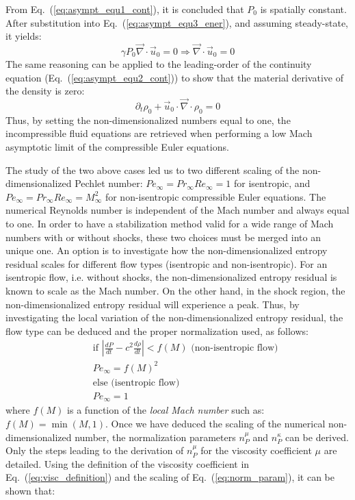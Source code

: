 \documentclass[preprint,10pt]{elsarticle}
\renewcommand{\div}{\vec{\nabla}\! \cdot \!}
\newcommand{\eqt}[1]{Eq.~(\ref{#1})}                     %
\begin{document}
\begin{itemize}
\begin{equation}
 \end{equation}
 From \eqt{eq:asympt_equ1_cont}, it is concluded that $P_0$ is spatially constant. After substitution into \eqt{eq:asympt_equ3_ener}, and assuming steady-state, it yields:
 \begin{equation}
\gamma P_0 \div  \vec{u}_0 = 0 \Rightarrow \div  \vec{u}_0 = 0
 \end{equation}
The same reasoning can be applied to the leading-order of the continuity equation (\eqt{eq:asympt_equ2_cont}) to show that the material derivative of the density is zero:
\begin{equation}
\partial_t \rho_0 + \vec{u}_0 \cdot \div \rho_0 = 0
\end{equation}
Thus, by setting the non-dimensionalized numbers equal to one, the incompressible fluid equations are retrieved when performing a low Mach asymptotic limit of the compressible Euler equations.
\end{itemize}
The study of the two above cases led us to two different scaling of the non-dimensionalized Pechlet number: $Pe_\infty = Pr_\infty Re_\infty = 1$ for isentropic, and$Pe_\infty  = Pr_\infty Re_\infty = M_\infty^2$ for non-isentropic compressible Euler equations. The numerical Reynolds number is independent of the Mach number and always equal to one. In order to have a stabilization method valid for a wide range of Mach numbers with or without shocks, these two choices must be merged into an unique one. An option is to investigate how the non-dimensionalized entropy residual scales for different flow types (isentropic and non-isentropic). For an isentropic flow, i.e. without shocks, the non-dimensionalized entropy residual is known to scale as the Mach number. On the other hand, in the shock region, the non-dimensionalized entropy residual will experience a peak. Thus, by investigating the local variation of the non-dimensionalized entropy residual, the flow type can be deduced and the proper normalization used, as follows:
\begin{eqnarray}  \label{eq:norm_ent}
&&\text{if } \left| \frac{dP}{dt} - c^2 \frac{d \rho}{dt} \right| < f(M) \text{ (non-isentropic flow)}\nonumber \\
&&Pe_\infty = f(M)^2 \nonumber \\
&&\text{else (isentropic flow)}\\
&&Pe_\infty = 1 \nonumber
\end{eqnarray}
where $f(M)$ is a function of the \emph{local Mach number} such as: $f(M) = \min (M, 1)$. Once we have deduced the scaling of the numerical non-dimensionalized number, the normalization parameters $n_P^{\mu}$ and $n_P^{\kappa}$ can be derived. Only the steps leading to the derivation of $n_P^{\mu}$ for the viscosity coefficient $\mu$ are detailed. Using the definition of the viscosity coefficient in \eqt{eq:visc_definition} and the scaling of \eqt{eq:norm_param}, it can be shown that:
\end{document}
